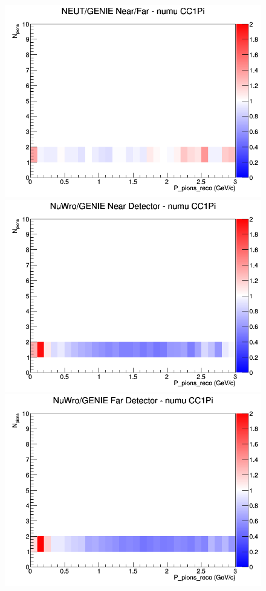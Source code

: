 \documentclass[12pt]{article}
\begin{document}
\begin{figure}[h]
\endminipage
{}
\includegraphics[width=\linewidth]{eff_N_P/FGT/pions/ratios/CC1Pi_NEUT_GENIE_numu_NF_N_P.png}
\endminipage
\newline
{}
\includegraphics[width=\linewidth]{eff_N_P/FGT/pions/ratios/CC1Pi_NuWro_GENIE_numu_near_N_P.png}
\endminipage
{}
\includegraphics[width=\linewidth]{eff_N_P/FGT/pions/ratios/CC1Pi_NuWro_GENIE_numu_far_N_P.png}

\end{figure}
\end{document}
